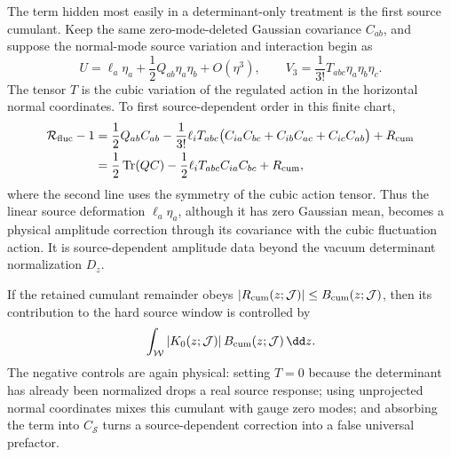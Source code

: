 \begin{controlledapproximation}
\label{ca:instanton-first-source-cumulant-normal-modes}
The term hidden most easily in a determinant-only treatment is the first
source cumulant.  Keep the same zero-mode-deleted Gaussian covariance
\(C_{ab}\), and suppose the normal-mode source variation and interaction begin
as
\[
  U=\ell_a\eta_a+\frac12Q_{ab}\eta_a\eta_b+O(\eta^3),
  \qquad
  V_3=\frac{1}{3!}T_{abc}\eta_a\eta_b\eta_c .
\]
The tensor \(T\) is the cubic variation of the regulated action in the
horizontal normal coordinates.  To first source-dependent order in this
finite chart,
\begin{equation}
\begin{aligned}
  \mathcal R_{\rm fluc}-1
  &=
  \frac12Q_{ab}C_{ab}
  -
  \frac{1}{3!}\ell_iT_{abc}
  \bigl(
    C_{ia}C_{bc}+C_{ib}C_{ac}+C_{ic}C_{ab}
  \bigr)
  +R_{\rm cum}                                      \\
  &=
  \frac12\operatorname{Tr}(QC)
  -
  \frac12\ell_iT_{abc}C_{ia}C_{bc}
  +R_{\rm cum},
\end{aligned}
  \label{eq:instanton-first-source-cumulant-normal}
\end{equation}
where the second line uses the symmetry of the cubic action tensor.  Thus the
linear source deformation \(\ell_a\eta_a\), although it has zero Gaussian
mean, becomes a physical amplitude correction through its covariance with the
cubic fluctuation action.  It is source-dependent amplitude data beyond the
vacuum determinant normalization \(D_z\).

If the retained cumulant remainder obeys
\(|R_{\rm cum}(z;\mathcal J)|\le B_{\rm cum}(z;\mathcal J)\), then its
contribution to the hard source window is controlled by
\[
  \int_{\mathcal W}
  |K_0(z;\mathcal J)|\,B_{\rm cum}(z;\mathcal J)\,\dd z .
\]
The negative controls are again physical: setting \(T=0\) because the
determinant has already been normalized drops a real source response; using
unprojected normal coordinates mixes this cumulant with gauge zero modes; and
absorbing the term into \(C_{\mathcal S}\) turns a source-dependent correction
into a false universal prefactor.
\end{controlledapproximation}

